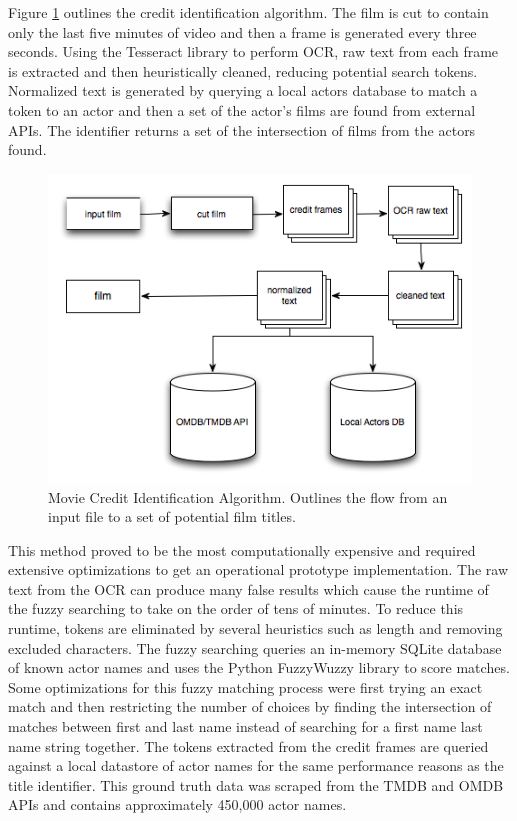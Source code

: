 \documentclass[paper=a4, fontsize=11pt]{scrartcl} %
\numberwithin{equation}{section} %
\numberwithin{figure}{section} %
\numberwithin{table}{section} %
\begin{document}
Figure \ref{fig:credit-identifier} outlines the credit identification algorithm. The film is cut to contain only the last five minutes of video and then a frame is generated every three seconds. Using the Tesseract library to perform OCR, raw text from each frame is extracted and then heuristically cleaned, reducing potential search tokens. Normalized text is generated by querying a local actors database to match a token to an actor and then a set of the actor's films are found from external APIs. The identifier returns a set of the intersection of films from the actors found. \\


\begin{figure}[H]
\center\includegraphics[scale=0.80]{credit-identifier.png}
\caption{Movie Credit Identification Algorithm. Outlines the flow from an input file to a set of potential film titles.}
\label{fig:credit-identifier}
\end{figure}


This method proved to be the most computationally expensive and required extensive optimizations to get an operational prototype implementation. The raw text from the OCR can produce many false results which cause the runtime of the fuzzy searching to take on the order of tens of minutes. To reduce this runtime, tokens are eliminated by several heuristics such as length and removing excluded characters. The fuzzy searching queries an in-memory SQLite database of known actor names and uses the Python FuzzyWuzzy library to score matches. \\

Some optimizations for this fuzzy matching process were first trying an exact match and then restricting the number of choices by finding the intersection of matches between first and last name instead of searching for a first name last name string together. The tokens extracted from the credit frames are queried against a local datastore of actor names for the same performance reasons as the title identifier. This ground truth data was scraped from the TMDB and OMDB APIs and contains approximately 450,000 actor names. \\
\end{document}
